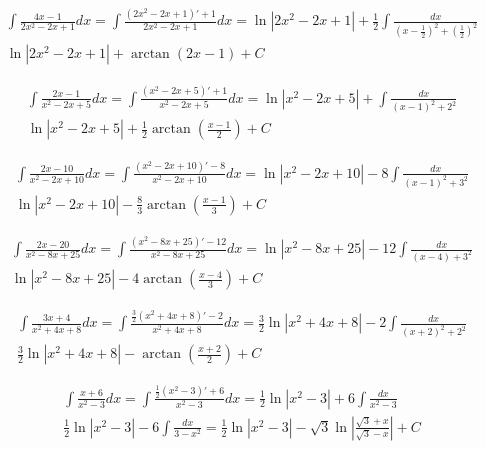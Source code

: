 
\begin{gather*}\int \frac{4x-1}{2x^2-2x+1}dx=\int \frac{(2x^2-2x+1)'+1}{2x^2-2x+1}dx=\ln|2x^2-2x+1|+\frac{1}{2}\int \frac{dx}{(x-\frac{1}{2})^2+(\frac{1}{2})^2}\\
\ln|2x^2-2x+1|+\arctan (2x-1)+C\end{gather*}



\begin{gather*}\int \frac{2x-1}{x^2-2x+5}dx=\int \frac{(x^2-2x+5)'+1}{x^2-2x+5}dx = \ln|x^2-2x+5|+\int \frac{dx}{(x-1)^2+2^2} \\
 \ln|x^2-2x+5|+\frac{1}{2}\arctan \left(\frac{x-1}{2}\right)+C\end{gather*}



\begin{gather*}\int \frac{2x-10}{x^2-2x+10}dx = \int \frac{(x^2-2x+10)'-8}{x^2-2x+10}dx = \ln|x^2-2x+10|-8\int \frac{dx}{(x-1)^2+3^2} \\
 \ln|x^2-2x+10|- \frac{8}{3}\arctan \left( \frac{x-1}{3} \right) +C\end{gather*}



\begin{gather*}\int \frac{2x-20}{x^2-8x+25}dx = \int \frac{(x^2-8x+25)'-12}{x^2-8x+25}dx = \ln|x^2-8x+25|-12\int \frac{dx}{(x-4)+3^2} \\
 \ln|x^2-8x+25|-4\arctan \left( \frac{x-4}{3} \right)+C\end{gather*}



\begin{gather*}\int \frac{3x+4}{x^2+4x+8}dx = \int \frac{\frac{3}{2}(x^2+4x+8)'-2}{x^2+4x+8}dx = \frac{3}{2}\ln|x^2+4x+8|-2\int \frac{dx}{(x+2)^2+2^2}\\
\frac{3}{2}\ln|x^2+4x+8|-\arctan \left( \frac{x+2}{2} \right) +C\end{gather*}



\begin{gather*}\int \frac{x+6}{x^2-3}dx = \int \frac{\frac{1}{2}(x^2-3)'+6}{x^2-3}dx= \frac{1}{2}\ln|x^2-3|+6\int \frac{dx}{x^2-3}\\
\frac{1}{2}\ln|x^2-3|-6\int \frac{dx}{3-x^2} = \frac{1}{2}\ln|x^2-3|-\sqrt{3}\ln\left|\frac{\sqrt{3}+x}{\sqrt{3}-x}\right|+C\end{gather*}


